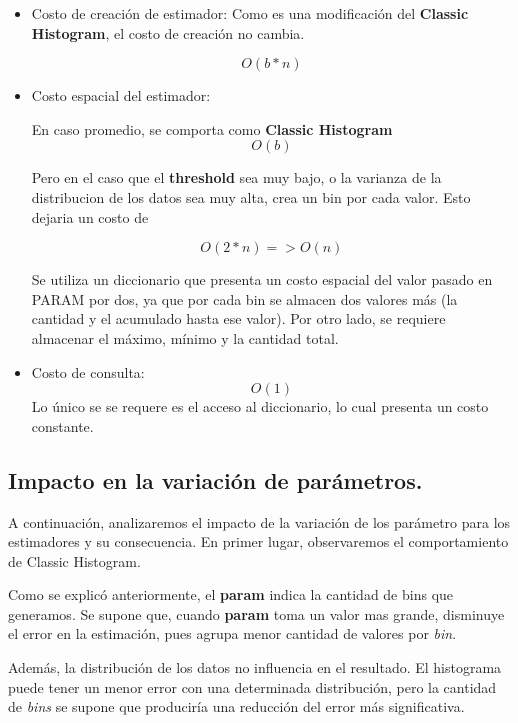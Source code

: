 \documentclass[10pt, a4paper,english,spanish,hidelinks]{article}
\begin{document}
\begin{itemize}

\item Costo de creación de estimador:
Como es una modificación del \textbf{Classic Histogram}, el costo de creación no cambia.

\begin{equation}
O(b * n)
\end{equation}

\item Costo espacial del estimador:

En caso promedio, se comporta como \textbf{Classic Histogram}
\begin{equation}
O(b)
\end{equation}

Pero en el caso que el \textbf{threshold} sea muy bajo, o la varianza de la distribucion de los datos sea muy alta, crea un bin por cada valor. Esto dejaria un costo de

\begin{equation}
O(2 * n) => O(n)
\end{equation}


Se utiliza un diccionario que presenta un costo espacial del valor pasado en PARAM por dos,
ya que por cada bin se almacen dos valores más (la cantidad y el acumulado hasta ese valor).
Por otro lado, se requiere almacenar el máximo, mínimo y la cantidad total.


\item Costo de consulta:
\begin{equation}
O(1)
\end{equation}
Lo único se se requere es el acceso al diccionario, lo cual presenta un costo constante.
\end{itemize}


\subsection{Impacto en la variación de parámetros.}
A continuación, analizaremos el impacto de la variación de los parámetro para los estimadores y su consecuencia. En primer lugar, observaremos el comportamiento de Classic Histogram. 

Como se explicó anteriormente, el \textbf{param} indica la cantidad de bins que generamos. Se supone que, cuando \textbf{param} toma un valor mas grande, disminuye el error en la estimación,
pues agrupa menor cantidad de valores por \textit{bin}.

Además, la distribución de los datos no influencia en el resultado. El histograma puede tener un menor error con una determinada distribución, pero la cantidad de
\textit{bins} se supone que produciría una reducción del error más significativa.
\end{document}
